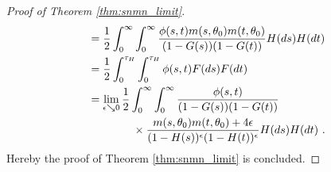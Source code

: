 \begin{proof}[Proof of Theorem \ref{thm:snmn_limit}]
\begin{align*}
		&= \frac{1}{2}\int_{0}^{\infty} \int_{0}^{\infty} \frac{\phi(s,t)m(s,\theta_0)m(t,\theta_0)}{(1-G(s))(1-G(t))} H(ds)H(dt)\\
		&= \frac{1}{2}\int_{0}^{\tau_H} \int_{0}^{\tau_H} \phi(s,t)F(ds)F(dt)\\
		&= \lim\limits_{\epsilon\searrow 0} \frac{1}{2}\int_{0}^{\infty} \int_{0}^{\infty} \frac{\phi(s,t)}{(1-G(s))(1-G(t))}\\
		&\qquad\qquad \times \frac{m(s,\theta_0)m(t,\theta_0) + 4\epsilon}{(1-H(s))^\epsilon(1-H(t))^\epsilon} H(ds)H(dt)\textrm{ .}
	\end{align*}
	Hereby the proof of Theorem \ref{thm:snmn_limit} is concluded. 
\end{proof}